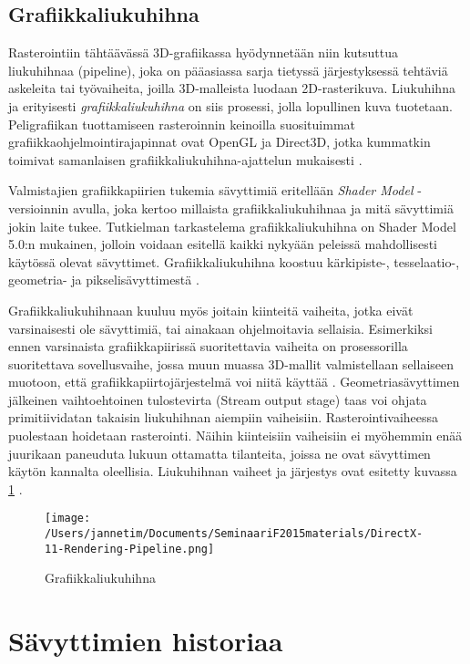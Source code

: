 \documentclass[finnish]{tktltiki2}
\theoremstyle{definition}
\theoremstyle{remark}
\begin{document}
\subsection{Grafiikkaliukuhihna}
Rasterointiin tähtäävässä 3D-grafiikassa hyödynnetään niin kutsuttua liukuhihnaa (pipeline), joka on pääasiassa sarja tietyssä järjestyksessä tehtäviä askeleita tai työvaiheita, joilla 3D-malleista luodaan 2D-rasterikuva. Liukuhihna ja erityisesti \emph{grafiikkaliukuhihna} on siis prosessi, jolla lopullinen kuva tuotetaan. Peligrafiikan tuottamiseen rasteroinnin keinoilla suosituimmat grafiikkaohjelmointirajapinnat ovat OpenGL ja Direct3D, jotka kummatkin toimivat samanlaisen grafiikkaliukuhihna-ajattelun mukaisesti \cite{Khr15} \cite{Mic11}.

Valmistajien grafiikkapiirien tukemia sävyttimiä eritellään \emph{Shader Model} -versioinnin avulla, joka kertoo millaista grafiikkaliukuhihnaa ja mitä sävyttimiä jokin laite tukee. Tutkielman tarkastelema grafiikkaliukuhihna on Shader Model 5.0:n mukainen, jolloin voidaan esitellä kaikki nykyään peleissä mahdollisesti käytössä olevat sävyttimet. Grafiikkaliukuhihna koostuu kärkipiste-, tesselaatio-, geometria- ja pikselisävyttimestä \cite{Mic11}.

Grafiikkaliukuhihnaan kuuluu myös joitain kiinteitä vaiheita, jotka eivät varsinaisesti ole sävyttimiä, tai ainakaan ohjelmoitavia sellaisia. Esimerkiksi ennen varsinaista grafiikkapiirissä suoritettavia vaiheita on prosessorilla suoritettava sovellusvaihe, jossa muun muassa 3D-mallit valmistellaan sellaiseen muotoon, että grafiikkapiirtojärjestelmä voi niitä käyttää \cite[s. 164-165]{Puh08}. Geometriasävyttimen jälkeinen vaihtoehtoinen tulostevirta (Stream output stage) taas voi ohjata primitiividatan takaisin liukuhihnan aiempiin vaiheisiin. Rasterointivaiheessa puolestaan hoidetaan rasterointi. Näihin kiinteisiin vaiheisiin ei myöhemmin enää juurikaan paneuduta lukuun ottamatta tilanteita, joissa ne ovat sävyttimen käytön kannalta oleellisia. Liukuhihnan vaiheet ja järjestys ovat esitetty kuvassa \ref{gpipe} \cite{Mic11}.

\begin{figure}[!htb]
\centering
\texttt{[image: /Users/jannetim/Documents/SeminaariF2015materials/DirectX-11-Rendering-Pipeline.png]}
\caption{Grafiikkaliukuhihna}
\label{gpipe}
\end{figure}

\section{Sävyttimien historiaa}
\end{document}
